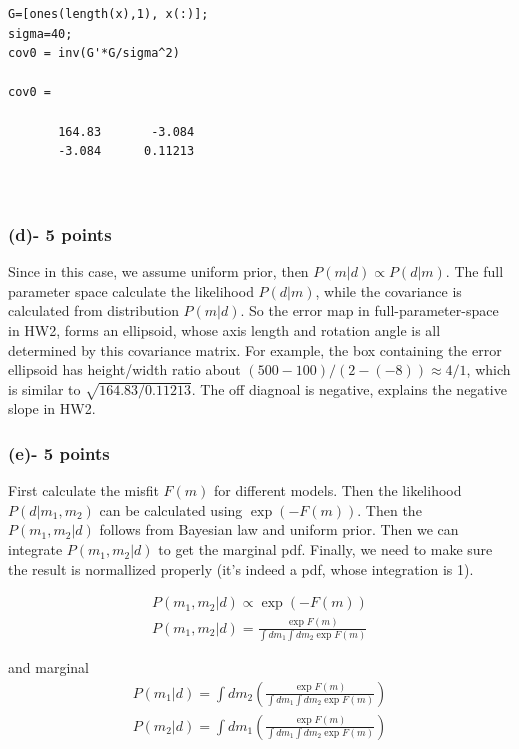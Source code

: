 \documentclass[11pt]{article}
\begin{document}
\begin{verbatim}
G=[ones(length(x),1), x(:)];
sigma=40;
cov0 = inv(G'*G/sigma^2)

cov0 =

       164.83       -3.084
       -3.084      0.11213



\end{verbatim}

\subsubsection*{(d)- 5 points}
Since in this case, we assume uniform prior, then $P(m|d) \propto P(d|m)$. 
The full parameter space calculate the likelihood  $P(d|m)$, while the covariance is calculated from distribution $P(m|d)$.  So the error map in full-parameter-space in HW2, forms an ellipsoid, whose axis length and rotation angle is all determined by this covariance matrix. For example, the box containing the error ellipsoid has height/width ratio about $(500-100)/(2- (-8)) \approx 4/1 $, which is similar to $\sqrt{164.83/0.11213}$. The off diagnoal is negative, explains the negative slope in HW2. 

\subsubsection*{(e)- 5 points}

First calculate the misfit $F(m)$ for different models. Then the likelihood $P(d|m_1,m_2)$ can be calculated using $\exp(-F(m))$. Then the $P(m_1,m_2|d)$ follows from Bayesian law and uniform prior. Then we can integrate $P(m_1,m_2|d)$ to get the marginal pdf. Finally, we need to make sure the result is normallized properly (it's indeed a pdf, whose integration is 1). 
 
\begin{eqnarray*}
P(m_1, m_2 | d) \propto  \exp( -F(m) )  \\
P(m_1, m_2 | d) = \frac{\exp{F(m)}}{\int dm_1 \int dm_2 \exp{F(m)}}
\end{eqnarray*}

and marginal
\begin{eqnarray*}
P(m_1| d) = \int dm_2 \left( \frac{\exp{F(m)}}{\int dm_1 \int dm_2 \exp{F(m)}} \right ) \\
P(m_2| d) = \int dm_1 \left( \frac{\exp{F(m)}}{\int dm_1 \int dm_2 \exp{F(m)}} \right ) \\
\end{eqnarray*}
\end{document}
